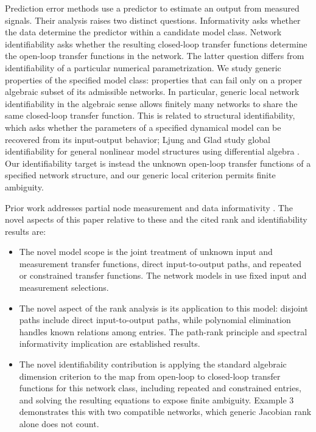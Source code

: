 \documentclass[journal,twoside,web]{ieeecolor}
\begin{document}
Prediction error methods use a predictor to estimate an output from measured
signals. Their analysis raises two distinct questions. Informativity asks whether
the data determine the predictor within a candidate model class. Network
identifiability asks whether the resulting closed-loop transfer functions
determine the open-loop transfer functions in the network. The latter question differs
from identifiability of a particular numerical parametrization. We study
generic properties of the specified model class: properties that can fail
only on a proper algebraic subset of its admissible networks. In particular,
generic local network identifiability in the algebraic sense allows finitely
many networks to share the same closed-loop transfer function.
This is related to structural identifiability, which asks whether the
parameters of a specified dynamical model can be recovered from its
input-output behavior; Ljung and Glad study global identifiability for
general nonlinear model structures using differential algebra
\cite{LjungGlad1994}. Our identifiability target is instead the unknown
open-loop transfer functions of a specified network structure, and our
generic local criterion permits finite ambiguity.

Prior work addresses partial node measurement
\cite{hen+gev+baz19,9303890,SHI2022110093} and data informativity
\cite{VANDENHOF20132994,BOMBOIS2023110742}. The novel aspects of this
paper relative to these and the cited rank and identifiability results are:
\begin{itemize}
\setlength{\itemsep}{0pt}\setlength{\parsep}{0pt}\setlength{\topsep}{2pt}
\item The novel model scope is the joint treatment of unknown input and
measurement transfer functions, direct input-to-output paths, and repeated
or constrained transfer functions. The network models in
\cite{hen+gev+baz19,9303890} use fixed input and measurement selections.
\item The novel aspect of the rank analysis is its application to this
model: disjoint paths include direct input-to-output paths, while
polynomial elimination handles known relations among entries. The
path-rank principle \cite{wou91} and spectral informativity implication
\cite{Ljung1999} are established results.
\item The novel identifiability contribution is applying the standard
algebraic dimension criterion \cite{cox+lit+she92} to the map from open-loop
to closed-loop transfer functions for this network class, including repeated and constrained
entries, and solving the resulting equations to expose finite ambiguity.
Example 3 demonstrates this with two compatible networks, which generic
Jacobian rank alone does not count.
\end{itemize}
%
\end{document}
